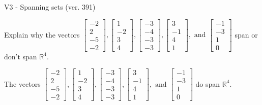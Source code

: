 \begin{exercise}
  \begin{exerciseTitle}V3 - Spanning sets (ver. 391)\end{exerciseTitle}
  \begin{exerciseStatement}
    Explain why the vectors \(\left[\begin{array}{r}
-2 \\
2 \\
-5 \\
-2
\end{array}\right] , \left[\begin{array}{r}
1 \\
-2 \\
3 \\
4
\end{array}\right] , \left[\begin{array}{r}
-3 \\
-4 \\
-3 \\
-3
\end{array}\right] , \left[\begin{array}{r}
3 \\
-1 \\
4 \\
1
\end{array}\right] , \text{ and } \left[\begin{array}{r}
-1 \\
-3 \\
1 \\
0
\end{array}\right]\) span or don't span \(\mathbb{R}^4\). 
	


  \end{exerciseStatement}
  \begin{exerciseAnswer}
   The vectors \(\left[\begin{array}{r}
-2 \\
2 \\
-5 \\
-2
\end{array}\right] , \left[\begin{array}{r}
1 \\
-2 \\
3 \\
4
\end{array}\right] , \left[\begin{array}{r}
-3 \\
-4 \\
-3 \\
-3
\end{array}\right] , \left[\begin{array}{r}
3 \\
-1 \\
4 \\
1
\end{array}\right] , \text{ and } \left[\begin{array}{r}
-1 \\
-3 \\
1 \\
0
\end{array}\right]\) 
  	 do  
	span \(\mathbb{R}^4\).
  



\end{exerciseAnswer}
\end{exercise}
